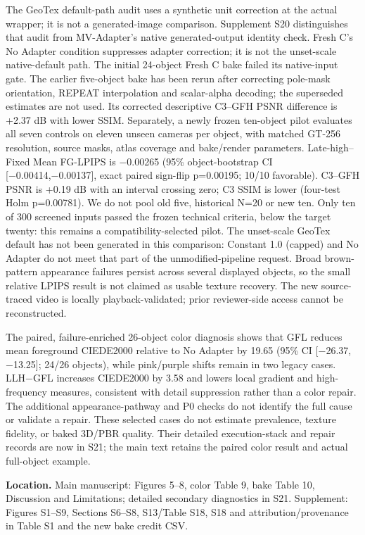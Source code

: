 \documentclass[
  10pt,
]{article}
\begin{document}
The GeoTex default-path audit uses a synthetic unit correction at the
actual wrapper; it is not a generated-image comparison. Supplement S20
distinguishes that audit from MV-Adapter's native generated-output
identity check. Fresh C's No Adapter condition suppresses adapter
correction; it is not the unset-scale native-default path. The initial
24-object Fresh C bake failed its native-input gate. The earlier
five-object bake has been rerun after correcting pole-mask orientation,
REPEAT interpolation and scalar-alpha decoding; the superseded estimates
are not used. Its corrected descriptive C3--GFH PSNR difference is +2.37
dB with lower SSIM. Separately, a newly frozen ten-object pilot
evaluates all seven controls on eleven unseen cameras per object, with
matched GT-256 resolution, source masks, atlas coverage and bake/render
parameters. Late-high--Fixed Mean FG-LPIPS is −0.00265 (95\%
object-bootstrap CI {[}−0.00414,−0.00137{]}, exact paired sign-flip
p=0.00195; 10/10 favorable). C3--GFH PSNR is +0.19 dB with an interval
crossing zero; C3 SSIM is lower (four-test Holm p=0.00781). We do not
pool old five, historical N=20 or new ten. Only ten of 300 screened
inputs passed the frozen technical criteria, below the target twenty:
this remains a compatibility-selected pilot. The unset-scale GeoTex
default has not been generated in this comparison: Constant 1.0 (capped)
and No Adapter do not meet that part of the unmodified-pipeline request.
Broad brown-pattern appearance failures persist across several displayed
objects, so the small relative LPIPS result is not claimed as usable
texture recovery. The new source-traced video is locally
playback-validated; prior reviewer-side access cannot be reconstructed.

The paired, failure-enriched 26-object color diagnosis shows that GFL
reduces mean foreground CIEDE2000 relative to No Adapter by 19.65 (95\%
CI {[}−26.37, −13.25{]}; 24/26 objects), while pink/purple shifts remain
in two legacy cases. LLH−GFL increases CIEDE2000 by 3.58 and lowers
local gradient and high-frequency measures, consistent with detail
suppression rather than a color repair. The additional
appearance-pathway and P0 checks do not identify the full cause or
validate a repair. These selected cases do not estimate prevalence,
texture fidelity, or baked 3D/PBR quality. Their detailed
execution-stack and repair records are now in S21; the main text retains
the paired color result and actual full-object example.

\textbf{Location.} Main manuscript: Figures 5--8, color Table 9, bake
Table 10, Discussion and Limitations; detailed secondary diagnostics in
S21. Supplement: Figures S1--S9, Sections S6--S8, S13/Table S18, S18 and
attribution/provenance in Table S1 and the new bake credit CSV.
\end{document}
